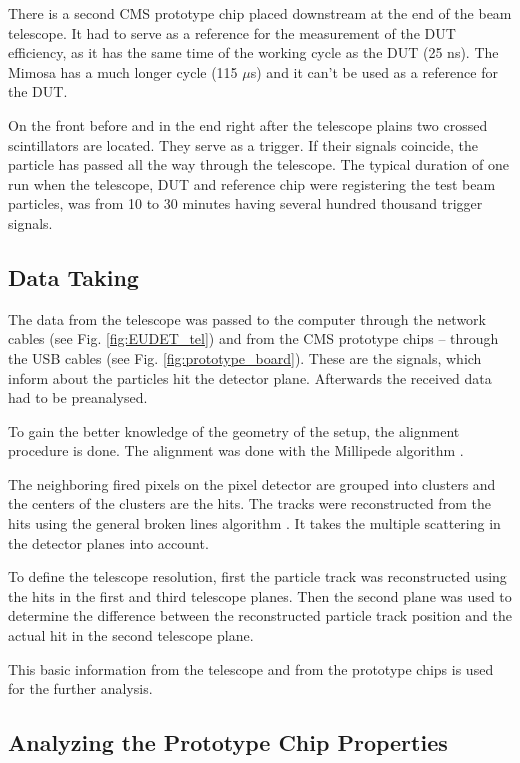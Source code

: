 There is a second CMS prototype chip placed downstream at the end of the beam telescope. It had to serve as a reference for the
measurement of the DUT efficiency, as it has the same time of the working cycle as the DUT (25 ns). The Mimosa has a much longer
cycle (115 $\mu$s) and it can't be used as a reference for the DUT.

On the front before and in the end right after the telescope plains two crossed scintillators are located. They serve as a trigger. 
If their signals coincide, the particle has passed all the way through the telescope.
The typical duration of one run when the telescope, DUT and reference chip were registering the test beam particles, was from 10
to 30 minutes having several hundred thousand trigger signals.

\subsection{Data Taking}

The data from the telescope was passed to the computer through the network cables (see Fig. \ref{fig:EUDET_tel}) and from
the CMS prototype chips -- through the USB cables (see Fig. \ref{fig:prototype_board}). These are the signals, which inform
about the particles hit the detector plane.  Afterwards the received data had to be preanalysed. 

To gain the better knowledge of the geometry of the setup, the alignment procedure is done. The alignment was done with the
Millipede algorithm \cite{1748-0221-3-09-P09002}.

The neighboring fired pixels on the pixel detector are grouped into clusters and the centers of the clusters are the hits.
The tracks were reconstructed from the hits using the general broken lines algorithm \cite{Blobel:2006yi}. It takes the multiple 
scattering in the detector planes into account. 

To define the telescope resolution, first the particle track was reconstructed using the hits in the first and third telescope planes.
Then the second plane was used to determine the difference between the reconstructed particle track position and the actual hit in the 
second telescope plane.

This basic information from the telescope and from the prototype chips is used for the further analysis.

\subsection{Analyzing the Prototype Chip Properties}

